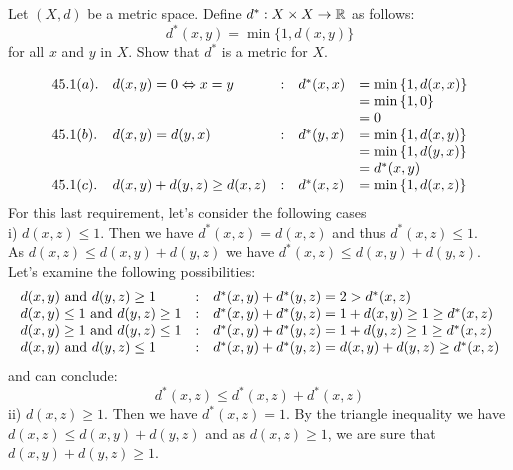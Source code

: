 \renewcommand{\thesubsection}{\thesection.\arabic{subsection}}
\subsection{}
\begin{tcolorbox}
Let $(X, d)$ be a metric space. Define $d^*:X \times X \rightarrow \mathbb{R}$ as follows:
$$d^*(x,y) = \min{\{1, d(x, y)\}}$$
for all $x$ and $y$ in $X$. Show that $d^*$ is a metric for $X$.
\end{tcolorbox}
\begin{align*}
\begin{array}{l l l l l}
 45.1(a).& d(x, y) = 0 \Leftrightarrow  x =y&:&d^*(x, x)& =\min{\{1, d(x, x)\}}\\
 &&&&=\min{\{1, 0\}}\\
 &&&&=0\\
 45.1(b). &d(x, y) = d(y, x)&:&d^*(y, x)&=\min{\{1, d(x, y)\}}\\
 &&&&=\min{\{1, d(y, x)\}}\\
 &&&&=d^*(x, y)\\
45.1 (c). &d(x,y) + d(y, z)\geq d(x, z)&:&d^*(x, z)&=\min{\{1, d(x, z)\}}
\end{array}
\end{align*}
For this last requirement, let's consider the following cases\\
i) $d(x, z)\leq 1$. Then we have $d^*(x, z)=d(x, z)$ and thus $d^*(x, z)\leq 1$.\\
 As $d(x, z)\leq d(x, y)+d(y, z)$ we have $d^*(x, z)\leq d(x, y)+d(y, z)$.\\
 Let's examine the following possibilities:
\begin{align*}
\begin{array}{l c  l}
d(x, y)\text{ and } d(y, z)\geq 1&: &d^*(x, y)+d^*(y, z)=2>d^*(x, z)\\
d(x, y)\leq 1\text{ and } d(y, z)\geq 1&: &d^*(x, y)+d^*(y, z)=1+d(x, y)\geq 1 \geq d^*(x, z)\\
d(x, y)\geq 1 \text{ and } d(y, z)\leq 1&: &d^*(x, y)+d^*(y, z)=1+d(y, z)\geq 1\geq d^*(x, z)\\
d(x, y)\text{ and } d(y, z)\leq 1&: &d^*(x, y)+d^*(y, z)=d(x, y)+d(y, z)\geq d^*(x, z)
\end{array}
\end{align*}
and can conclude:
$$d^*(x, z)\leq d^*(x, z)+d^*(x, z)$$
ii) $d(x, z)\geq 1$. Then we have $d^*(x, z)=1$. By the triangle inequality we have $d(x, z)\leq d(x, y)+d(y, z)$ and as $d(x, z)\geq 1$, we are sure that $d(x, y)+d(y, z)\geq 1$.\\
